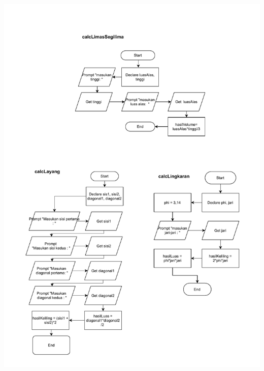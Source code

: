 \documentclass[
  12pt,
  answers  
]{exam}
\begin{document}
	\includegraphics[clip, scale=0.85, trim={2cm 0.5cm 1cm 0.5cm}]{pdf/Problem3-2.pdf}
\end{document}
